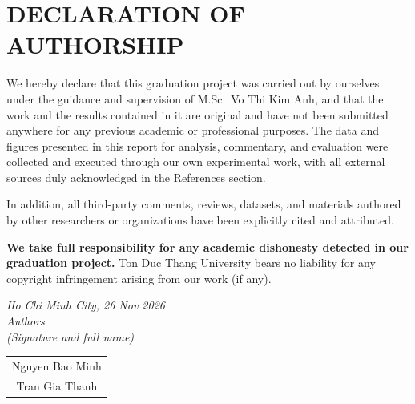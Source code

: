 \clearpage
\pagestyle{empty}
\chapter*{DECLARATION OF AUTHORSHIP}
\thispagestyle{empty}
\hspace*{\parindent}We hereby declare that this graduation project was carried out by ourselves under the guidance and supervision of M.Sc.\ Vo Thi Kim Anh, and that the work and the results contained in it are original and have not been submitted anywhere for any previous academic or professional purposes. The data and figures presented in this report for analysis, commentary, and evaluation were collected and executed through our own experimental work, with all external sources duly acknowledged in the References section.

In addition, all third-party comments, reviews, datasets, and materials authored by other researchers or organizations have been explicitly cited and attributed.

\textbf{We take full responsibility for any academic dishonesty detected in our graduation project.} Ton Duc Thang University bears no liability for any copyright infringement arising from our work (if any).

\vspace*{1cm}
\begin{flushright}
	\begin{minipage}{8.75cm}
		\centering
		\textit{Ho Chi Minh City, 26 Nov 2026}\\
		\textit{Authors}\\
		\textit{(Signature and full name)}\\[1.6cm]

		\begin{tabular}{c}
			Nguyen Bao Minh \\[1.6cm]
			Tran Gia Thanh \\
		\end{tabular}
	\end{minipage}
\end{flushright}
\clearpage
\pagestyle{fancy}

